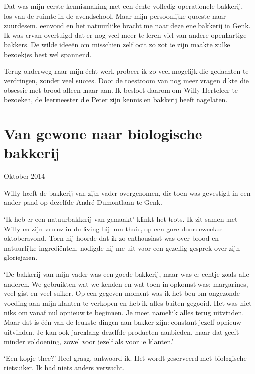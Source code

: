 \documentclass[
  11pt,
  dutch,
]{memoir}
\begin{document}
Dat was mijn eerste kennismaking met een échte volledig operationele
bakkerij, los van de ruimte in de avondschool. Maar mijn persoonlijke
queeste naar zuurdesem, eenvoud en het natuurlijke bracht me naar deze
ene bakkerij in Genk. Ik was ervan overtuigd dat er nog veel meer te
leren viel van andere openhartige bakkers. De wilde ideeën om misschien
zelf ooit zo zot te zijn maakte zulke bezoekjes best wel spannend.

Terug onderweg naar mijn écht werk probeer ik zo veel mogelijk die
gedachten te verdringen, zonder veel succes. Door de toestroom van nog
meer vragen dikte die obsessie met brood alleen maar aan. Ik besloot
daarom om Willy Herteleer te bezoeken, de leermeester die Peter zijn
kennis en bakkerij heeft nagelaten.

\hypertarget{van-gewone-naar-biologische-bakkerij}{%
\section{Van gewone naar biologische
bakkerij}\label{van-gewone-naar-biologische-bakkerij}}

\begin{flushright}
Oktober 2014
\end{flushright}

Willy heeft de bakkerij van zijn vader overgenomen, die toen was
gevestigd in een ander pand op dezelfde André Dumontlaan te Genk.

`Ik heb er een natuurbakkerij van gemaakt' klinkt het trots. Ik zit
samen met Willy en zijn vrouw in de living bij hun thuis, op een gure
doordeweekse oktoberavond. Toen hij hoorde dat ik zo enthousiast was
over brood en natuurlijke ingrediënten, nodigde hij me uit voor een
gezellig gesprek over zijn gloriejaren.

`De bakkerij van mijn vader was een goede bakkerij, maar was er eentje
zoals alle anderen. We gebruikten wat we kenden en wat toen in opkomst
was: margarines, veel gist en veel suiker. Op een gegeven moment was ik
het beu om ongezonde voeding aan mijn klanten te verkopen en heb ik
alles buiten gegooid. Het was niet niks om vanaf nul opnieuw te
beginnen. Je moet namelijk alles terug uitvinden. Maar dat is één van de
leukste dingen aan bakker zijn: constant jezelf opnieuw uitvinden. Je
kan ook jarenlang dezelfde producten aanbieden, maar dat geeft minder
voldoening, zowel voor jezelf als voor je klanten.'

`Een kopje thee?' Heel graag, antwoord ik. Het wordt geserveerd met
biologische rietsuiker. Ik had niets anders verwacht.
\end{document}
